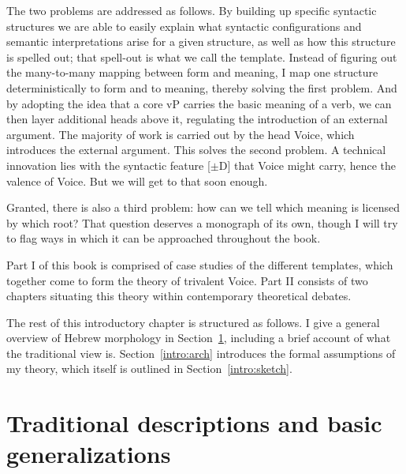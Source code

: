 The two problems are addressed as follows. By building up specific syntactic structures we are able to easily explain what syntactic configurations and semantic interpretations arise for a given structure, as well as how this structure is spelled out; that spell-out is what we call the template. Instead of figuring out the many-to-many mapping between form and meaning, I map one structure deterministically to form and to meaning, thereby solving the first problem. And by adopting the idea that a core vP carries the basic meaning of a verb, we can then layer additional heads above it, regulating the introduction of an external argument. The majority of work is carried out by the head Voice, which introduces the external argument. This solves the second problem. A technical innovation lies with the syntactic feature [$\pm$D] that Voice might carry, hence the valence of Voice. But we will get to that soon enough.

Granted, there is also a third problem: how can we tell which meaning is licensed by which root? That question deserves a monograph of its own, though I will try to flag ways in which it can be approached throughout the book.

Part I of this book is comprised of case studies of the different templates, which together come to form the theory of trivalent Voice. Part II consists of two chapters situating this theory within contemporary theoretical debates.

The rest of this introductory chapter is structured as follows. I give a general overview of Hebrew morphology in Section~\ref{intro:basic}, including a brief account of what the traditional view is. Section~\ref{intro:arch} introduces the formal assumptions of my theory, which itself is outlined in Section~\ref{intro:sketch}.


\section{Traditional descriptions and basic generalizations} \label{intro:basic}
